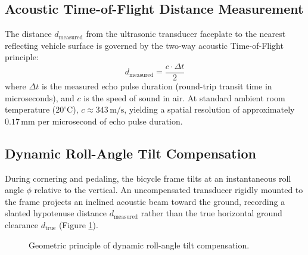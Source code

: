 \subsection{Acoustic Time-of-Flight Distance Measurement}
The distance $d_{\text{measured}}$ from the ultrasonic transducer faceplate to the nearest reflecting vehicle surface is governed by the two-way acoustic Time-of-Flight principle:
\begin{equation}
    d_{\text{measured}} = \frac{c \cdot \Delta t}{2}
\end{equation}
where $\Delta t$ is the measured echo pulse duration (round-trip transit time in microseconds), and $c$ is the speed of sound in air. At standard ambient room temperature ($20^\circ\text{C}$), $c \approx 343\,\text{m/s}$, yielding a spatial resolution of approximately $0.17\,\text{mm}$ per microsecond of echo pulse duration.

\subsection{Dynamic Roll-Angle Tilt Compensation}
\label{sec:tilt_comp}
During cornering and pedaling, the bicycle frame tilts at an instantaneous roll angle $\phi$ relative to the vertical. An uncompensated transducer rigidly mounted to the frame projects an inclined acoustic beam toward the ground, recording a slanted hypotenuse distance $d_{\text{measured}}$ rather than the true horizontal ground clearance $d_{\text{true}}$ (Figure \ref{fig:tilt_geometry}).

\begin{figure}[h!]
	\centering
	\caption{Geometric principle of dynamic roll-angle tilt compensation.}
	\label{fig:tilt_geometry}
\end{figure}

